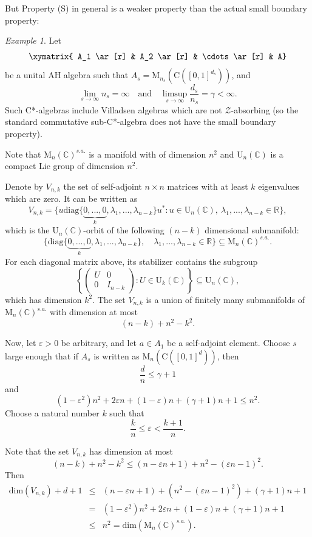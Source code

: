 \documentclass[12pt, oneside, psamsfonts]{amsart}
\theoremstyle{definition}
\theoremstyle{remark}
\newtheorem{example}[thm]{Example}
\numberwithin{equation}{section}
\newcommand{\Real}{\mathbb R}
\newcommand{\Comp}{\mathbb C}
\newcommand{\eps}{\varepsilon}
\begin{document}
But Property (S) in general is a weaker property than the actual small boundary property:
\begin{example}\label{weak-S}
Let
$$
\xymatrix{
A_1 \ar[r] & A_2 \ar[r] & \cdots \ar[r] & A}
$$
be a unital AH algebra such that $A_s = \mathrm{M}_{n_s}(\mathrm{C}([0, 1]^{d_s}))$, and $$ \lim_{s \to\infty}n_s = \infty \quad \mathrm{and}\quad  \limsup_{s \to \infty}\frac{d_s}{n_s} = \gamma < \infty.$$ Such C*-algebras include Villadsen algebras which are not $\mathcal Z$-absorbing (so the standard commutative sub-C*-algebra does not have the small boundary property).

Note that $\mathrm{M}_n(\Comp)^{s.a.}$ is a manifold with of dimension $n^2$ and $\mathrm{U}_n(\Comp)$ is a compact Lie group of dimension $n^2$.

Denote by $V_{n, k}$ the set of self-adjoint $n \times n$ matrices with at least $k$ eigenvalues which are zero. It can be written as
$$ V_{n, k}=\{u\mathrm{diag}\{\underbrace{0, ..., 0}_k, \lambda_1, ..., \lambda_{n-k}\}u^*: u \in \mathrm{U}_n(\Comp),\ \lambda_1, ..., \lambda_{n-k} \in \Real\},$$
which is the $\mathrm{U}_n(\Comp)$-orbit of the following $(n-k)$ dimensional submanifold: $$\{\mathrm{diag}\{\underbrace{0, ..., 0}_k, \lambda_1, ..., \lambda_{n-k}\},\quad \lambda_1, ..., \lambda_{n-k} \in \Real\} \subseteq \mathrm{M}_n(\Comp)^{s.a.}.$$ 
For each diagonal matrix above, its stabilizer contains the subgroup
$$
\left\{
\left( 
\begin{array}{cc}
U & 0 \\
0 & I_{n-k}
\end{array}
\right): U \in \mathrm{U}_k(\Comp)
\right\} \subseteq \mathrm{U}_n(\Comp),
$$
which has dimension $k^2$.
The set $V_{n, k}$ is a union of finitely many submanifolds of $ \mathrm{M}_n(\Comp)^{s.a.}$ with dimension at most $$ (n - k) + n^2 - k^2.$$

Now, let $\eps>0$ be arbitrary, and let $a \in A_1$ be a self-adjoint element.
Choose $s$ large enough that if $A_s$ is written as $\mathrm{M}_{n}(\mathrm{C}([0, 1]^{d}))$, then
$$ \frac{d}{n} \leq \gamma+1$$
and
$$
(1 - \eps^2) n^2 + 2\eps n +  (1-\eps)n + (\gamma+1) n + 1 \leq n^2.
$$
Choose a natural number $k$ such that
$$
\frac{k}{n} \leq \eps < \frac{k+1}{n}.
$$

Note that the set $V_{n, k}$ has dimension at most
$$(n-k) + n^2 - k^2 \leq (n - \eps n +1) + n^2 - (\eps n-1)^2.$$
Then 
\begin{eqnarray*}
\mathrm{dim}(V_{n, k}) + d + 1 & \leq & (n - \eps n +1) + (n^2 - (\eps n-1)^2) + (\gamma + 1) n + 1 \\
& = & (1-\eps^2)n^2 +2\eps n  + (1-\eps)n + (\gamma+ 1)n+ 1 \\
&\leq & n^2 = \mathrm{dim}(\mathrm{M}_n(\Comp)^{s.a.}).
\end{eqnarray*}


\end{example}
\end{document}
